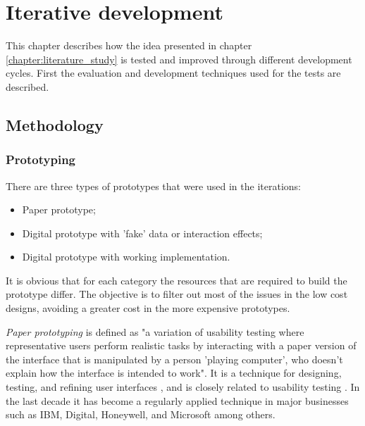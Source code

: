 \chapter{Iterative development}\label{chapter:prototype}


This chapter describes how the idea presented in chapter \ref{chapter:literature_study} is tested and improved through different development cycles. First the evaluation and development techniques used for the tests are described.


\section{Methodology}\label{chapter:prototype:section:methodology}

\subsection{Prototyping}\label{chapter:prototype:section:methodology:subsection:development}


There are three types of prototypes that were used in the iterations:

\begin{itemize}
	\item Paper prototype;
	\item Digital prototype with 'fake' data or interaction effects;
	\item Digital prototype with working implementation.
\end{itemize}

It is obvious that for each category the resources that are required to build the prototype differ. The objective is to filter out most of the issues in the low cost designs, avoiding a greater cost in the more expensive prototypes.

\emph{Paper prototyping} is defined as "a variation of usability testing where representative users perform realistic tasks by interacting with a paper version of the interface that is manipulated by a person 'playing computer', who doesn’t explain how the interface is intended to work"\cite{snyder:2003:web}. It is a technique for designing, testing, and refining user interfaces \cite{snyder:2003}, and is closely related to usability testing \cite{snyder:2003:web}. In the last decade it has become a regularly applied technique in major businesses such as IBM, Digital, Honeywell, and Microsoft among others\cite{snyder:2003}.

